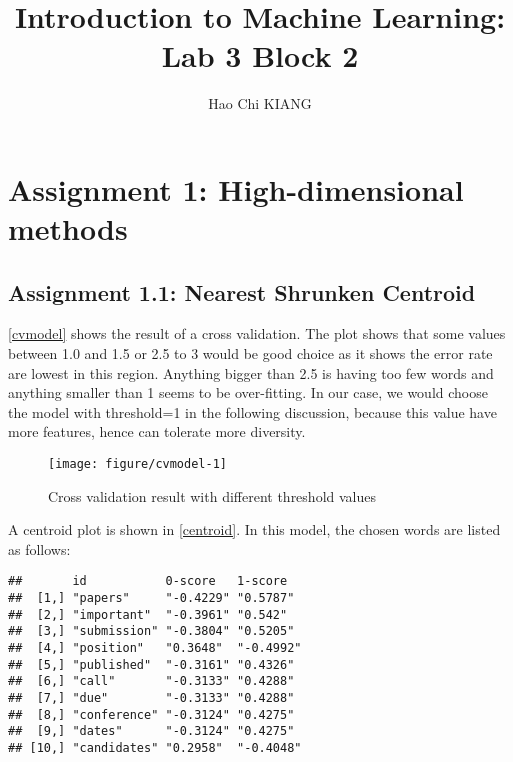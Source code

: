 \documentclass[11pt,english]{article}\usepackage[]{graphicx}\usepackage[]{color}
\makeatletter
\def\maxwidth{ %
  \ifdim\Gin@nat@width>\linewidth
    \linewidth
  \else
    \Gin@nat@width
  \fi
}
\newenvironment{kframe}{%
 \def\at@end@of@kframe{}%
 \ifinner\ifhmode%
  \def\at@end@of@kframe{\end{minipage}}%
  \begin{minipage}{\columnwidth}%
 \fi\fi%
 \def\FrameCommand##1{\hskip\@totalleftmargin \hskip-\fboxsep
 \colorbox{shadecolor}{##1}\hskip-\fboxsep
     \hskip-\linewidth \hskip-\@totalleftmargin \hskip\columnwidth}%
 \MakeFramed {\advance\hsize-\width
   \@totalleftmargin\z@ \linewidth\hsize
   \@setminipage}}%
 {\par\unskip\endMakeFramed%
 \at@end@of@kframe}
\newenvironment{knitrout}{}{} %
\makeatother
\begin{document}
\author{Hao Chi KIANG}
\title{Introduction to Machine Learning: Lab 3 Block 2}
\maketitle



\section*{Assignment 1: High-dimensional methods}
\subsection*{Assignment 1.1: Nearest Shrunken Centroid}



\autoref{cvmodel} shows the result of a cross validation. The plot shows
that some values between 1.0 and 1.5 or 2.5 to 3 would be good choice as it
shows the error rate are lowest in this region. Anything bigger than 2.5 is
having too few words and anything smaller than 1 seems to be over-fitting.
In our case, we would choose the model with threshold=1 in the
following discussion, because this value have more features, hence can
tolerate more diversity.

\begin{figure}[H]
  \centering
\begin{knitrout}\small
{}\color{fgcolor}
\texttt{[image: figure/cvmodel-1]} 

\end{knitrout}
\caption{Cross validation result with different threshold values}
\label{cvmodel}
\end{figure}

A centroid plot is shown in \autoref{centroid}. In this model, the chosen
words are listed as follows:

\begin{knitrout}\small
{}\color{fgcolor}\begin{kframe}
\begin{verbatim}
##       id           0-score   1-score  
##  [1,] "papers"     "-0.4229" "0.5787" 
##  [2,] "important"  "-0.3961" "0.542"  
##  [3,] "submission" "-0.3804" "0.5205" 
##  [4,] "position"   "0.3648"  "-0.4992"
##  [5,] "published"  "-0.3161" "0.4326" 
##  [6,] "call"       "-0.3133" "0.4288" 
##  [7,] "due"        "-0.3133" "0.4288" 
##  [8,] "conference" "-0.3124" "0.4275" 
##  [9,] "dates"      "-0.3124" "0.4275" 
## [10,] "candidates" "0.2958"  "-0.4048"
\end{verbatim}
\end{kframe}
\end{knitrout}
\end{document}
